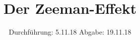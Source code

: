 

\subject{V 27}
\title{Der Zeeman-Effekt}
\date{
  Durchführung: 5.11.18
  \hspace{3em}
  Abgabe: 19.11.18
}



\maketitle
\thispagestyle{empty}
\tableofcontents
\newpage






\printbibliography




